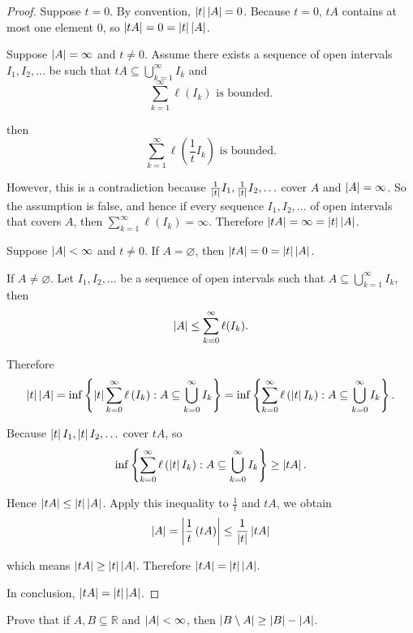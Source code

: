 \begin{proof}
    Suppose $t = 0$. By convention, $\left\vert{t}\right\vert\left\vert{A}\right\vert = 0$. Because $t = 0$, $tA$ contains at most one element $0$, so $\left\vert{tA}\right\vert = 0 = \left\vert{t}\right\vert\left\vert{A}\right\vert$.

    Suppose $\left\vert{A}\right\vert = \infty$ and $t\ne 0$. Assume there exists a sequence of open intervals $I_{1}, I_{2}, \ldots$ be such that $tA\subseteq\bigcup^{\infty}_{k=1}I_{k}$ and
    \[
        \sum^{\infty}_{k=1}\ell(I_{k})\text{ is bounded.}
    \]

    then
    \[
        \sum^{\infty}_{k=1}\ell\left(\frac{1}{t}I_{k}\right)\text{ is bounded.}
    \]

    However, this is a contradiction because $\frac{1}{\left\vert{t}\right\vert}I_{1}, \frac{1}{\left\vert{t}\right\vert}I_{2}, \ldots$ cover $A$ and $\left\vert{A}\right\vert = \infty$. So the assumption is false, and hence if every sequence $I_{1}, I_{2}, \ldots$ of open intervals that covers $A$, then $\sum^{\infty}_{k=1}\ell(I_{k}) = \infty$. Therefore $\left\vert{tA}\right\vert = \infty = \left\vert{t}\right\vert\left\vert{A}\right\vert$.

    Suppose $\left\vert{A}\right\vert < \infty$ and $t\ne 0$. If $A = \varnothing$, then $\left\vert{tA}\right\vert = 0 = \left\vert{t}\right\vert\left\vert{A}\right\vert$.

    If $A\ne\varnothing$. Let $I_{1}, I_{2}, \ldots$ be a sequence of open intervals such that $A\subseteq\bigcup^{\infty}_{k=1}I_{k}$, then
    \[
        \left\vert{A}\right\vert \leq \sum^{\infty}_{k=0}\ell(I_{k}).
    \]

    Therefore
    \[
        \left\vert{t}\right\vert\left\vert{A}\right\vert = \inf\left\{ \left\vert{t}\right\vert\sum^{\infty}_{k=0}\ell\left(I_{k}\right): A\subseteq \bigcup^{\infty}_{k=0}I_{k} \right\} = \inf\left\{ \sum^{\infty}_{k=0}\ell\left(\left\vert{t}\right\vert I_{k}\right): A\subseteq \bigcup^{\infty}_{k=0}I_{k} \right\}.
    \]

    Because $\left\vert{t}\right\vert I_{1}, \left\vert{t}\right\vert I_{2}, \ldots$ cover $tA$, so
    \[
        \inf\left\{ \sum^{\infty}_{k=0}\ell\left(\left\vert{t}\right\vert I_{k}\right): A\subseteq \bigcup^{\infty}_{k=0}I_{k} \right\} \geq \left\vert{tA}\right\vert.
    \]

    Hence $\left\vert{tA}\right\vert\leq \left\vert{t}\right\vert\left\vert{A}\right\vert$. Apply this inequality to $\frac{1}{t}$ and $tA$, we obtain
    \[
        \left\vert{A}\right\vert = \left\vert{\frac{1}{t}\left(tA\right)}\right\vert \leq \frac{1}{\left\vert{t}\right\vert}\left\vert{tA}\right\vert
    \]

    which means $\left\vert{tA}\right\vert\geq \left\vert{t}\right\vert\left\vert{A}\right\vert$. Therefore $\left\vert{tA}\right\vert = \left\vert{t}\right\vert\left\vert{A}\right\vert$.

    \bigskip
    In conclusion, $\left\vert{tA}\right\vert = \left\vert{t}\right\vert\left\vert{A}\right\vert$.
\end{proof}
\newpage

\begin{exercise}\label{chapter2:sectionA:exercise3}
    Prove that if $A, B\subseteq \mathbb{R}$ and $\left\vert{A}\right\vert < \infty$, then $\left\vert{B\setminus A}\right\vert\geq \left\vert{B}\right\vert - \left\vert{A}\right\vert$.
\end{exercise}

